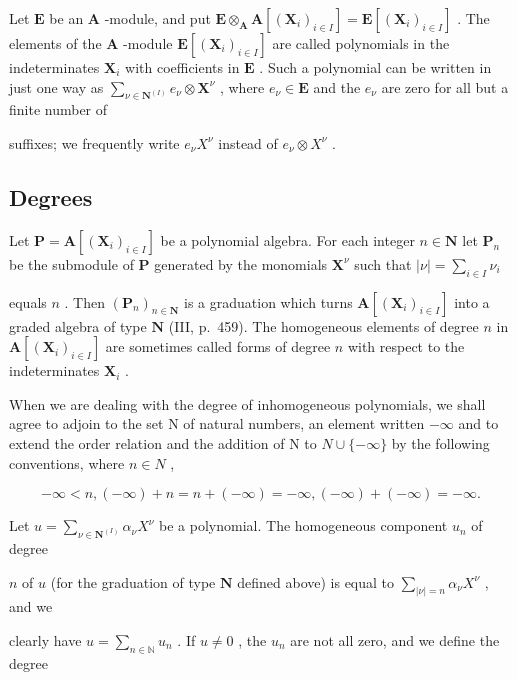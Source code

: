 Let \(\mathbf{E}\) be an \(\mathbf{A}\) -module, and put \(\mathbf{E} \otimes_{\mathbf{A}} \mathbf{A}[(\mathbf{X}_i)_{i \in I}] = \mathbf{E}[(\mathbf{X}_i)_{i \in I}]\) . The elements of the \(\mathbf{A}\) -module \(\mathbf{E}[(\mathbf{X}_i)_{i \in I}]\) are called polynomials in the indeterminates \(\mathbf{X}_i\) with coefficients in \(\mathbf{E}\) . Such a polynomial can be written in just one way as \(\sum_{\nu \in \mathbf{N}^{(I)}} e_\nu \otimes \mathbf{X}^\nu\) , where \(e_\nu \in \mathbf{E}\) and the \(e_\nu\) are zero for all but a finite number of

suffixes; we frequently write \(e_{\nu}X^{\nu}\) instead of \(e_{\nu}\otimes X^{\nu}\) .

\subsection{Degrees}

Let \(\mathbf{P} = \mathbf{A}[(\mathbf{X}_i)_{i\in I}]\) be a polynomial algebra. For each integer \(n\in \mathbf{N}\) let \(\mathbf{P}_n\) be the submodule of \(\mathbf{P}\) generated by the monomials \(\mathbf{X}^{\nu}\) such that \(|\nu| = \sum_{i\in I}\nu_i\)

equals \(n\) . Then \((\mathbf{P}_n)_{n \in \mathbf{N}}\) is a graduation which turns \(\mathbf{A}[(\mathbf{X}_i)_{i \in I}]\) into a graded algebra of type \(\mathbf{N}\) (III, p.~459). The homogeneous elements of degree \(n\) in \(\mathbf{A}[(\mathbf{X}_i)_{i \in I}]\) are sometimes called forms of degree \(n\) with respect to the indeterminates \(\mathbf{X}_i\) .

When we are dealing with the degree of inhomogeneous polynomials, we shall agree to adjoin to the set N of natural numbers, an element written \(-\infty\) and to extend the order relation and the addition of N to \(N \cup \{-\infty\}\) by the following conventions, where \(n \in N\) ,

\[
- \infty <   n, (- \infty) + n = n + (- \infty) = - \infty , (- \infty) + (- \infty) = - \infty .
\]

Let \(u = \sum_{\nu \in \mathbf{N}^{(I)}} \alpha_{\nu} X^{\nu}\) be a polynomial. The homogeneous component \(u_{n}\) of degree

\(n\) of \(u\) (for the graduation of type \(\mathbf{N}\) defined above) is equal to \(\sum_{|\nu| = n} \alpha_{\nu} X^{\nu}\) , and we

clearly have \(u = \sum_{n \in \mathbb{N}} u_n\) . If \(u \neq 0\) , the \(u_n\) are not all zero, and we define the degree

